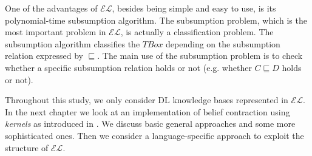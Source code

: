 One of the advantages of $\mathcal{EL}$, besides being simple and easy to use, is its polynomial-time subsumption algorithm. The subsumption problem, which is the most important problem in $\mathcal{EL}$, is actually a classification problem. The subsumption algorithm classifies the $TBox$ depending on the subsumption relation expressed by $\sqsubseteq$. The main use of the subsumption problem is to check whether a specific subsumption relation holds or not (e.g. whether $C \sqsubseteq D$ holds or not).

Throughout this study, we only consider DL knowledge bases represented in $\mathcal{EL}$. In the next chapter we look at an implementation of belief contraction using \textit{kernels} as introduced in \cite{zwei}. We discuss basic general approaches and some more sophisticated ones. Then we consider a language-specific approach to exploit the structure of $\mathcal{EL}$. 